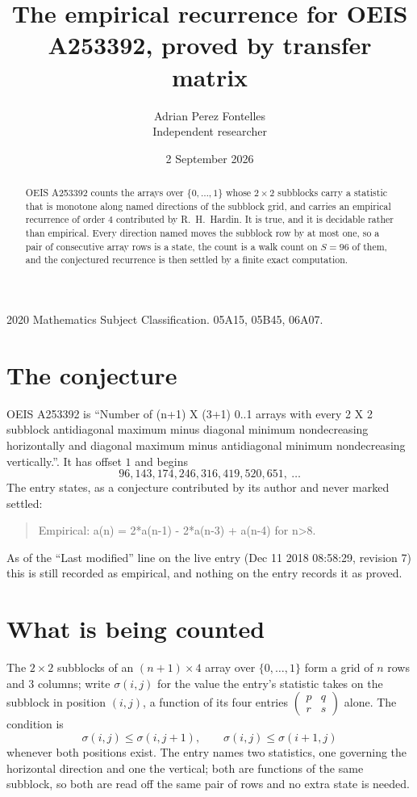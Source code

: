 \documentclass[11pt,a4paper]{article}
\title{The empirical recurrence for OEIS A253392, proved by transfer matrix}
\author{Adrian Perez Fontelles\\ \small Independent researcher}
\date{2 September 2026}
\theoremstyle{plain}
\theoremstyle{definition}
\begin{document}
\maketitle

\begin{abstract}
OEIS A253392 counts the arrays over $\{0,\dots,1\}$ whose $2\times2$ subblocks carry a
statistic that is monotone along named directions of the subblock grid, and carries an
empirical recurrence of order $4$ contributed by R.~H.~Hardin. It is true, and it is
decidable rather than empirical. Every direction named moves the subblock row by at most one,
so a pair of consecutive array rows is a state, the count is a walk count on $S=96$ of them,
and the conjectured recurrence is then settled by a finite exact computation.
\end{abstract}

\noindent\small 2020 Mathematics Subject Classification. 05A15, 05B45, 06A07.\normalsize

\section{The conjecture}

OEIS A253392 is ``Number of (n+1) X (3+1) 0..1 arrays with every 2 X 2 subblock antidiagonal maximum minus diagonal minimum nondecreasing horizontally and diagonal maximum minus antidiagonal minimum nondecreasing vertically.''. It has offset $1$ and begins
\[
96, 143, 174, 246, 316, 419, 520, 651,\ \dots
\]
The entry states, as a conjecture contributed by its author and never marked settled:
\begin{quote}
Empirical: a(n) = 2*a(n-1) - 2*a(n-3) + a(n-4) for n>8.
\end{quote}
As of the ``Last modified'' line on the live entry (Dec 11 2018 08:58:29, revision 7) this is still
recorded as empirical, and nothing on the entry records it as proved.

\section{What is being counted}

The $2\times2$ subblocks of an $(n+1)\times4$ array over $\{0,\dots,1\}$ form a grid
of $n$ rows and $3$ columns; write $\sigma(i,j)$ for the value the entry's statistic takes on
the subblock in position $(i,j)$, a function of its four entries
$\begin{pmatrix}p&q\\r&s\end{pmatrix}$ alone. The condition is
\[
\sigma(i,j)\le\sigma(i,j+1),\qquad \sigma(i,j)\le\sigma(i+1,j)
\]
whenever both positions exist. The entry names two statistics, one governing the horizontal direction and one the vertical; both are functions of the same subblock, so both are read off the same pair of rows and no extra state is needed.
\end{document}
